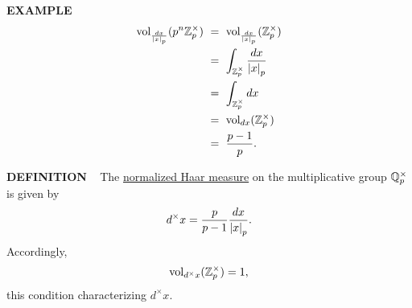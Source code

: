 \begin{x}{\small\bf EXAMPLE} \ %
\[
\allowdisplaybreaks
\begin{aligned}
\ds\vol_{\frac{dx}{\abs{x}_p}}(p^n\Z_p^\times) \
&= \ \vol_{\frac{dx}{\abs{x}_p}}(\Z_p^\times)\\
&= \ \int_{\Z_p^\times} \frac{dx}{\abs{x}_p} \\
&= \ \int_{\Z_p^\times} dx \\
&= \ \vol_{dx}(\Z_p^\times) \\
&= \ \frac{p-1}{p}.
\end{aligned}
\]
\end{x}

\vspace{0.1cm}


\begin{x}{\small\bf DEFINITION} \ %
The 
\underline{normalized Haar measure}
on the multiplicative group $\mathbb{Q}_p^\times$ is given by
\[
d^\times x = \frac{p}{p-1}\frac{dx}{\left\vert x\right\vert_p}.
\]
Accordingly,
\[
\text{vol}_{d^\times x} (\mathbb{Z}_p^\times) = 1,
\]
this condition characterizing $d^\times x$.
\end{x}

\vspace{0.1cm}


